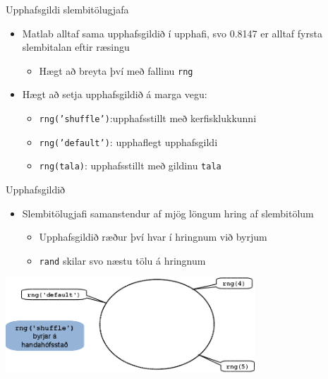 \documentclass{beamer}
\begin{document}
\begin{frame}{Upphafsgildi slembitölugjafa}
\begin{itemize}
 \item Matlab alltaf sama upphafsgildið í upphafi, svo 0.8147 er alltaf fyrsta slembitalan eftir ræsingu
 \begin{itemize}
  \item Hægt að breyta því með fallinu \texttt{rng}
 \end{itemize}
 \item Hægt að setja upphafsgildið á marga vegu:
 \begin{itemize}
  \item \texttt{rng('shuffle')}:upphafsstillt með kerfisklukkunni
  \item \texttt{rng('default')}: upphaflegt upphafsgildi
  \item \texttt{rng(tala)}: upphafsstillt með gildinu \texttt{tala}
 \end{itemize}
\end{itemize}
\end{frame}

\begin{frame}[shrink]{Upphafsgildið}
\vspace{1cm}
\begin{itemize}
 \item Slembitölugjafi samanstendur af mjög löngum hring af slembitölum
 \begin{itemize}
  \item Upphafsgildið ræður því hvar í hringnum við byrjum
  \item \texttt{rand} skilar svo næstu tölu á hringnum
 \end{itemize}
\end{itemize}
\begin{center}
\includegraphics[width=0.7\textwidth]{Pics/random-circle}
\end{center}
\end{frame}
\end{document}
